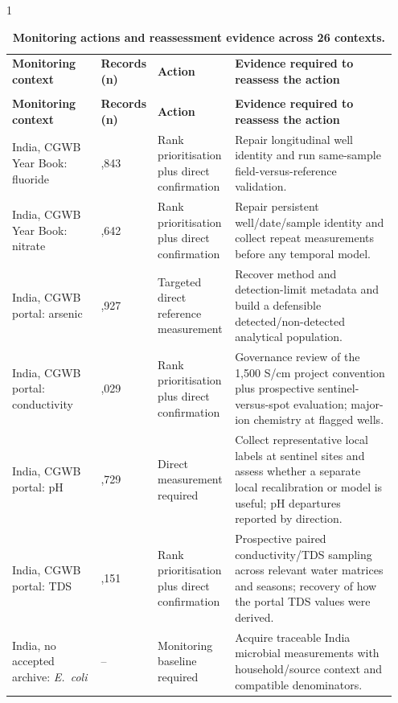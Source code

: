 \documentclass[10pt,letterpaper]{article}
\newlength\savedwidth
\newcommand\thickhline{\noalign{\global\savedwidth\arrayrulewidth\global\arrayrulewidth 2pt}%
\hline
\noalign{\global\arrayrulewidth\savedwidth}}
\begin{document}
\nolinenumbers
\begin{spacing}{1}
{\footnotesize\setlength{\tabcolsep}{3pt}\setlength{\LTcapwidth}{\linewidth}
\begin{longtable}{>{\raggedright\arraybackslash}p{0.2385\linewidth}>{\raggedleft\arraybackslash}p{0.0769\linewidth}>{\raggedright\arraybackslash}p{0.2077\linewidth}>{\raggedright\arraybackslash}p{0.4262\linewidth}}
\caption{\textbf{Monitoring actions and reassessment evidence across 26 contexts.}}\label{table1} \\
\hline
\textbf{Monitoring context} & \textbf{Records (n)} & \textbf{Action} & \textbf{Evidence required to reassess the action} \\ \thickhline
\endfirsthead
\multicolumn{4}{@{}l}{\footnotesize\emph{Table 1. (continued)}} \\
\hline
\textbf{Monitoring context} & \textbf{Records (n)} & \textbf{Action} & \textbf{Evidence required to reassess the action} \\ \thickhline
\endhead
India, CGWB Year Book: fluoride & 35,843 & Rank prioritisation plus direct confirmation & Repair longitudinal well identity and run same-sample field-versus-reference validation. \\ \hline
India, CGWB Year Book: nitrate & 34,642 & Rank prioritisation plus direct confirmation & Repair persistent well/date/sample identity and collect repeat measurements before any temporal model. \\ \hline
India, CGWB portal: arsenic & 9,927 & Targeted direct reference measurement & Recover method and detection-limit metadata and build a defensible detected/non-detected analytical population. \\ \hline
India, CGWB portal: conductivity & 173,029 & Rank prioritisation plus direct confirmation & Governance review of the 1,500 \textmu{}S/cm project convention plus prospective sentinel-versus-spot evaluation; major-ion chemistry at flagged wells. \\ \hline
India, CGWB portal: pH & 162,729 & Direct measurement required & Collect representative local labels at sentinel sites and assess whether a separate local recalibration or model is useful; pH departures reported by direction. \\ \hline
India, CGWB portal: TDS & 30,151 & Rank prioritisation plus direct confirmation & Prospective paired conductivity/TDS sampling across relevant water matrices and seasons; recovery of how the portal TDS values were derived. \\ \hline
India, no accepted archive: \textit{E.~coli} & -- & Monitoring baseline required & Acquire traceable India microbial measurements with household/source context and compatible denominators. \\ \hline

\end{longtable}}
\end{spacing}
\end{document}
